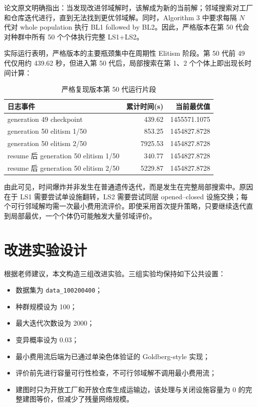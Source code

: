 \documentclass{article}
\begin{document}
论文原文明确指出：当发现改进邻域解时，该解成为新的当前解；邻域搜索对工厂和仓库迭代进行，直到无法找到更优邻域解。同时，Algorithm 3 中要求每隔 $N$ 代对 whole population 执行 BL1 followed by BL2。因此，严格版本在第 50 代会对种群中所有 50 个个体执行完整 LS1+LS2。

实际运行表明，严格版本的主要瓶颈集中在周期性 Elitism 阶段。第 50 代前 49 代仅用约 439.62 秒，但进入第 50 代后，局部搜索在第 1、2 个个体上即出现长时间计算：

\begin{table}[H]
\centering
\caption{严格复现版本第 50 代运行片段}
\begin{tabular}{lrr}
\toprule
日志事件 & 累计时间(s) & 当前最优值 \\
\midrule
generation 49 checkpoint & 439.62 & 1455571.1075 \\
generation 50 elitism 1/50 & 853.25 & 1454827.8728 \\
generation 50 elitism 2/50 & 7925.53 & 1454827.8728 \\
resume 后 generation 50 elitism 1/50 & 340.77 & 1454827.8728 \\
resume 后 generation 50 elitism 2/50 & 5229.87 & 1454827.8728 \\
\bottomrule
\end{tabular}
\end{table}

由此可见，时间爆炸并非发生在普通遗传迭代，而是发生在完整局部搜索中。原因在于 LS1 需要尝试单设施翻转，LS2 需要尝试同层 opened--closed 设施交换；每个可行邻域解均需一次最小费用流评价。即使采用首次提升策略，只要继续迭代直到局部最优，一个个体仍可能触发大量邻域评价。

\section{改进实验设计}

根据老师建议，本文构造三组改进实验。三组实验均保持如下公共设置：

\begin{itemize}
    \item 数据集为 \texttt{data\_100200400}；
    \item 种群规模设为 100；
    \item 最大迭代次数设为 2000；
    \item 变异概率设为 0.03；
    \item 最小费用流后端为已通过单染色体验证的 Goldberg-style 实现；
    \item 评价前先进行容量可行性检查，不可行邻域解不调用最小费用流；
    \item 建图时只为开放工厂和开放仓库生成运输边，该处理与关闭设施容量为 0 的完整建图等价，但减少了残量网络规模。
\end{itemize}
\end{document}
